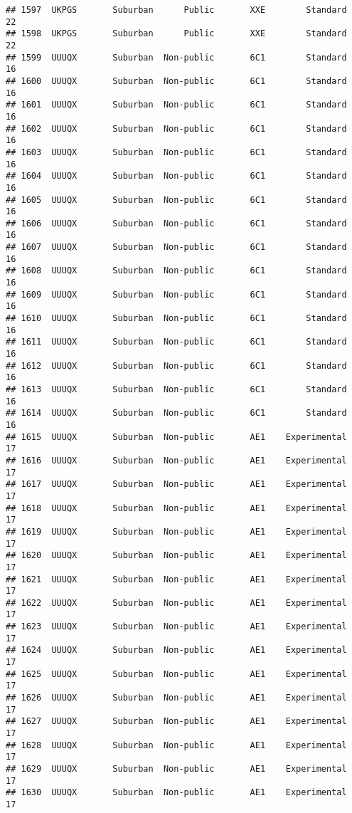 \documentclass[
]{article}
\begin{document}
\begin{verbatim}
## 1597  UKPGS       Suburban      Public       XXE        Standard        22
## 1598  UKPGS       Suburban      Public       XXE        Standard        22
## 1599  UUUQX       Suburban  Non-public       6C1        Standard        16
## 1600  UUUQX       Suburban  Non-public       6C1        Standard        16
## 1601  UUUQX       Suburban  Non-public       6C1        Standard        16
## 1602  UUUQX       Suburban  Non-public       6C1        Standard        16
## 1603  UUUQX       Suburban  Non-public       6C1        Standard        16
## 1604  UUUQX       Suburban  Non-public       6C1        Standard        16
## 1605  UUUQX       Suburban  Non-public       6C1        Standard        16
## 1606  UUUQX       Suburban  Non-public       6C1        Standard        16
## 1607  UUUQX       Suburban  Non-public       6C1        Standard        16
## 1608  UUUQX       Suburban  Non-public       6C1        Standard        16
## 1609  UUUQX       Suburban  Non-public       6C1        Standard        16
## 1610  UUUQX       Suburban  Non-public       6C1        Standard        16
## 1611  UUUQX       Suburban  Non-public       6C1        Standard        16
## 1612  UUUQX       Suburban  Non-public       6C1        Standard        16
## 1613  UUUQX       Suburban  Non-public       6C1        Standard        16
## 1614  UUUQX       Suburban  Non-public       6C1        Standard        16
## 1615  UUUQX       Suburban  Non-public       AE1    Experimental        17
## 1616  UUUQX       Suburban  Non-public       AE1    Experimental        17
## 1617  UUUQX       Suburban  Non-public       AE1    Experimental        17
## 1618  UUUQX       Suburban  Non-public       AE1    Experimental        17
## 1619  UUUQX       Suburban  Non-public       AE1    Experimental        17
## 1620  UUUQX       Suburban  Non-public       AE1    Experimental        17
## 1621  UUUQX       Suburban  Non-public       AE1    Experimental        17
## 1622  UUUQX       Suburban  Non-public       AE1    Experimental        17
## 1623  UUUQX       Suburban  Non-public       AE1    Experimental        17
## 1624  UUUQX       Suburban  Non-public       AE1    Experimental        17
## 1625  UUUQX       Suburban  Non-public       AE1    Experimental        17
## 1626  UUUQX       Suburban  Non-public       AE1    Experimental        17
## 1627  UUUQX       Suburban  Non-public       AE1    Experimental        17
## 1628  UUUQX       Suburban  Non-public       AE1    Experimental        17
## 1629  UUUQX       Suburban  Non-public       AE1    Experimental        17
## 1630  UUUQX       Suburban  Non-public       AE1    Experimental        17

\end{verbatim}
\end{document}
